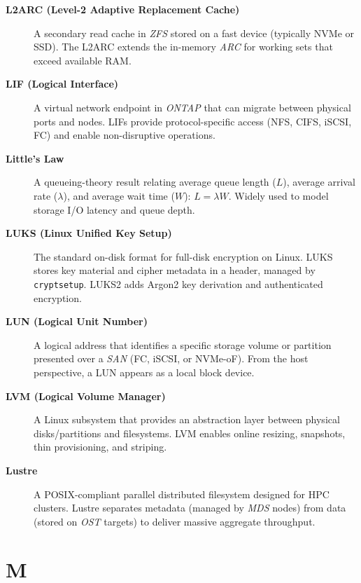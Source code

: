 \begin{description}

\item[\textbf{L2ARC (Level-2 Adaptive Replacement Cache)}]
A secondary read cache in \textit{ZFS} stored on a fast device (typically
NVMe or SSD). The L2ARC extends the in-memory \textit{ARC} for
working sets that exceed available RAM.

\item[\textbf{LIF (Logical Interface)}]
A virtual network endpoint in \textit{ONTAP} that can migrate between
physical ports and nodes. LIFs provide protocol-specific access (NFS,
CIFS, iSCSI, FC) and enable non-disruptive operations.

\item[\textbf{Little's Law}]
A queueing-theory result relating average queue length ($L$), average
arrival rate ($\lambda$), and average wait time ($W$): $L = \lambda W$.
Widely used to model storage I/O latency and queue depth.

\item[\textbf{LUKS (Linux Unified Key Setup)}]
The standard on-disk format for full-disk encryption on Linux. LUKS stores
key material and cipher metadata in a header, managed by
\texttt{cryptsetup}. LUKS2 adds Argon2 key derivation and authenticated
encryption.

\item[\textbf{LUN (Logical Unit Number)}]
A logical address that identifies a specific storage volume or partition
presented over a \textit{SAN} (FC, iSCSI, or NVMe-oF). From the host
perspective, a LUN appears as a local block device.

\item[\textbf{LVM (Logical Volume Manager)}]
A Linux subsystem that provides an abstraction layer between physical
disks/partitions and filesystems. LVM enables online resizing, snapshots,
thin provisioning, and striping.

\item[\textbf{Lustre}]
A POSIX-compliant parallel distributed filesystem designed for HPC clusters.
Lustre separates metadata (managed by \textit{MDS} nodes) from data
(stored on \textit{OST} targets) to deliver massive aggregate throughput.

\end{description}

\section*{M}

